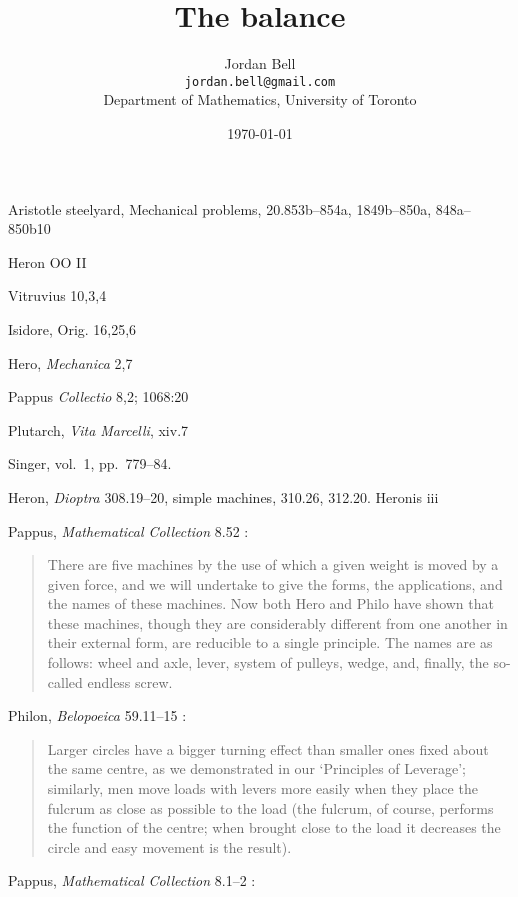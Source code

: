 \documentclass{article}
\title{The balance}
\author{Jordan Bell\\ \texttt{jordan.bell@gmail.com}\\Department of Mathematics, University of Toronto}
\date{\today}
\begin{document}
\maketitle

Aristotle steelyard, Mechanical problems, 20.853b--854a, 1849b--850a, 848a--850b10

Heron OO II

Vitruvius 10,3,4

Isidore, Orig. 16,25,6

Hero, {\em Mechanica} 2,7

Pappus {\em Collectio} 8,2; 1068:20

Plutarch, {\em Vita Marcelli}, xiv.7


Singer, vol.~1, pp.~779--84.

Heron, {\em Dioptra} 308.19--20, simple machines, 310.26, 312.20. Heronis iii


Pappus, {\em Mathematical Collection} 8.52 \cite[p.~49]{humphrey}:

\begin{quote}
There are five machines by the use of which a given weight is moved by a
given force, and we will undertake to give the forms, the applications, and the
names of these machines. Now both Hero and Philo have shown that these
machines, though they are considerably different from one another in their
external form, are reducible to a single principle. The names are as follows:
wheel and axle, lever, system of pulleys, wedge, and, finally, the so-called
endless screw.
\end{quote}

Philon, {\em Belopoeica} 59.11--15 \cite[p.~123]{marsden}:

\begin{quote}
Larger circles have a bigger turning effect than smaller ones fixed about
the same centre, as we  demonstrated in our `Principles of Leverage'; 
similarly, men move loads with levers more easily when they place the
fulcrum as close as possible to the load (the fulcrum, of course, performs
the function of the centre; when brought close to the load it decreases the
circle and easy movement is the result).
\end{quote}


Pappus, {\em Mathematical Collection} 8.1--2 \cite[pp.~47--48]{humphrey}:
\end{document}
